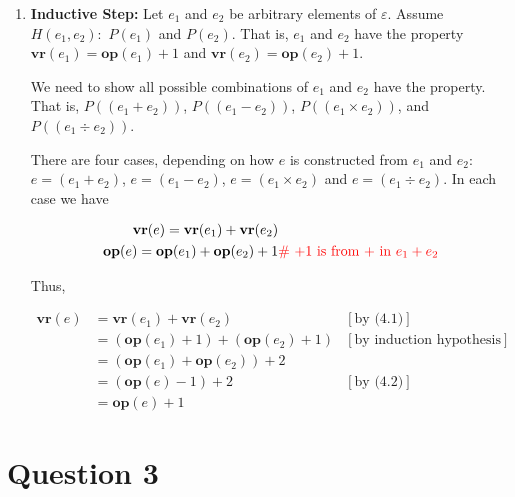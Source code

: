 \documentclass[12pt]{article}
\begin{document}
\begin{itemize}
\begin{itemize}
\begin{enumerate}[1.]
            \item \textbf{Inductive Step:} Let $e_1$ and $e_2$ be arbitrary elements of $\varepsilon$.
            Assume $H({e_1,e_2}):$ $P(e_1)$ and $P(e_2)$. That is, $e_1$ and $e_2$
            have the property $\textbf{vr}(e_1) = \textbf{op}(e_1) + 1$ and
            $\textbf{vr}(e_2) = \textbf{op}(e_2) + 1$.

            \bigskip

            We need to show all possible combinations of $e_1$ and $e_2$ have the
            property. That is, $P((e_1 + e_2))$, $P((e_1 - e_2))$, $P((e_1 \times e_2))$,
            and $P((e_1 \div e_2))$.

            \begin{mdframed}

            There are four cases, depending on how $e$ is constructed from $e_1$ and $e_2$:
            $e = (e_1 + e_2)$, $e = (e_1 - e_2)$, $e = (e_1 \times e_2)$ and $e = (e_1 \div e_2)$.
            In each case we have

            \begin{align}
                \textbf{vr}(e) = \textbf{vr}(e_1) + \textbf{vr}(e_2) & \\
                \textbf{op}(e) = \textbf{op}(e_1) + \textbf{op}(e_2) + 1 & \color{red}\text{\# +1 is from + in $e_1 + e_2$}
            \end{align}

            \bigskip

            Thus,

            \begin{align}
                \textbf{vr}(e) &= \textbf{vr}(e_1) + \textbf{vr}(e_2) & [\text{by (4.1)}]\\
                &= (\textbf{op}(e_1) + 1) + (\textbf{op}(e_2) + 1) & [\text{by induction hypothesis}]\\
                &= (\textbf{op}(e_1) + \textbf{op}(e_2)) + 2\\
                &= (\textbf{op}(e) - 1) + 2 & [\text{by (4.2)}]\\
                &= \textbf{op}(e) + 1
            \end{align}

            \end{mdframed}
        \end{enumerate}
    \end{itemize}
\end{itemize}

\section*{Question 3}
\end{document}
